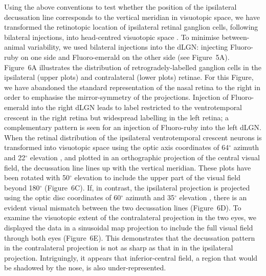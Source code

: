 \documentclass[10pt]{article}
\newcounter{Figure}
\begin{document}
Using the above conventions to test whether the position of the
ipsilateral decussation line corresponds to the vertical meridian in
visuotopic space, we have transformed the retinotopic location of
ipsilateral retinal ganglion cells, following bilateral injections,
into head-centred visuotopic space \cite{BishopEtal1962}. To minimise
between-animal variability, we used bilateral injections into the
dLGN: injecting Fluoro-ruby on one side and Fluoro-emerald on the
other side (see Figure~5A). Figure~6A illustrates the distribution of
retrogradely-labelled ganglion cells in the ipsilateral (upper plots)
and contralateral (lower plots) retinae. For this Figure, we have
abandoned the standard representation of the nasal retina to the
right in order to emphasise the mirror-symmetry of the projections.
Injection of Fluoro-emerald into the right dLGN leads to label
restricted to the ventrotemporal crescent in the right retina but
widespread labelling in the left retina; a complementary pattern is
seen for an injection of Fluoro-ruby into the left dLGN. When the
retinal distribution of the ipsilateral ventrotemporal crescent
neurons is transformed into visuotopic space using the optic axis
coordinates of 64$^{\circ}$ azimuth and 22$^{\circ}$ elevation \cite{OommenStahl2008}, and plotted in an orthographic projection of the central
visual field, the decussation line lines up with the vertical
meridian. These plots have been rotated with 50$^{\circ}$ elevation to
include the upper part of the visual field beyond 180$^{\circ}$
(Figure~6C). If, in contrast, the ipsilateral projection is projected
using the optic disc coordinates of 60$^{\circ}$ azimuth and 35$^{\circ}$
elevation \cite{Drager1978}, there is an evident visual mismatch between
the two decussation lines (Figure~6D). To examine the visuotopic
extent of the contralateral projection in the two eyes, we displayed
the data in a sinusoidal map projection to include the full visual
field through both eyes (Figure~6E). This demonstrates that the
decussation pattern in the contralateral projection is not as sharp
as that in in the ipsilateral projection. Intriguingly, it appears
that inferior-central field, a region that would be shadowed by the
nose, is also under-represented. 
\end{document}
